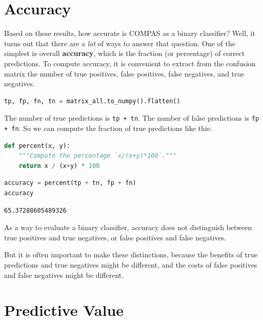 \hypertarget{accuracy}{%
\section{Accuracy}\label{accuracy}}

Based on these results, how accurate is COMPAS as a binary classifier?
Well, it turns out that there are a \emph{lot} of ways to answer that
question. One of the simplest is overall \textbf{accuracy}, which is the
fraction (or percentage) of correct predictions. To compute accuracy, it
is convenient to extract from the confusion matrix the number of true
positives, false positives, false negatives, and true negatives.

\begin{lstlisting}[language=Python,style=source]
tp, fp, fn, tn = matrix_all.to_numpy().flatten()
\end{lstlisting}

The number of true predictions is \passthrough{\lstinline!tp + tn!}. The
number of false predictions is \passthrough{\lstinline!fp + fn!}. So we
can compute the fraction of true predictions like this:

\begin{lstlisting}[language=Python,style=source]
def percent(x, y):
    """Compute the percentage `x/(x+y)*100`."""
    return x / (x+y) * 100
\end{lstlisting}

\begin{lstlisting}[language=Python,style=source]
accuracy = percent(tp + tn, fp + fn)
accuracy
\end{lstlisting}

\begin{lstlisting}[style=output]
65.37288605489326
\end{lstlisting}

As a way to evaluate a binary classifier, accuracy does not distinguish
between true positives and true negatives, or false positives and false
negatives.

But it is often important to make these distinctions, because the
benefits of true predictions and true negatives might be different, and
the costs of false positives and false negatives might be different.

\hypertarget{predictive-value}{%
\section{Predictive Value}\label{predictive-value}}

